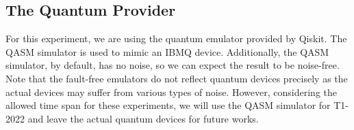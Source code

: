 \subsection{The Quantum Provider}
For this experiment, we are using the quantum emulator provided by Qiskit.
The QASM simulator is used to mimic an IBMQ device.
Additionally, the QASM simulator, by default, has no noise, so we can expect the result to be noise-free.
Note that the fault-free emulators do not reflect quantum devices precisely as the actual devices may suffer from various types of noise.
However, considering the allowed time span for these experiments, we will use the QASM simulator for T1-2022 and leave the actual quantum devices for future works.